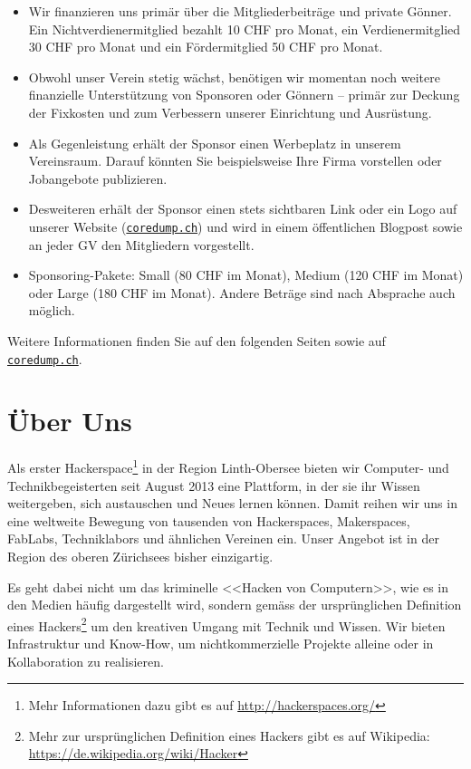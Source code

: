 \documentclass[10pt,a4paper,parskip,fleqn]{scrartcl}
\begin{document}
\begin{itemize}
	\item Wir finanzieren uns primär über die Mitgliederbeiträge und private
		Gönner. Ein Nichtverdienermitglied bezahlt 10 CHF pro Monat, ein
		Verdienermitglied 30 CHF pro Monat und ein Fördermitglied 50 CHF pro Monat.
	\item Obwohl unser Verein stetig wächst, benötigen wir momentan noch weitere
		finanzielle Unterstützung von Sponsoren oder Gönnern -- primär zur Deckung
		der Fixkosten und zum Verbessern unserer Einrichtung und Ausrüstung.
	\item Als Gegenleistung erhält der Sponsor einen Werbeplatz in unserem
		Vereinsraum. Darauf könnten Sie beispielsweise Ihre Firma vorstellen oder
		Jobangebote publizieren.
	\item Desweiteren erhält der Sponsor einen stets sichtbaren Link oder ein Logo
		auf unserer Website (\href{https://www.coredump.ch/}{\texttt{coredump.ch}})
		und wird in einem öffentlichen Blogpost sowie an jeder GV den Mitgliedern
		vorgestellt.
	\item Sponsoring-Pakete: Small (80 CHF im Monat), Medium (120 CHF im Monat)
		oder Large (180 CHF im Monat). Andere Beträge sind nach Absprache auch
		möglich.
\end{itemize}

Weitere Informationen finden Sie auf den folgenden Seiten sowie auf
\href{https://www.coredump.ch/}{\texttt{coredump.ch}}.

\newpage

\section{Über Uns}

Als erster Hackerspace\footnote{Mehr Informationen dazu gibt es auf
\url{http://hackerspaces.org/}} in der Region Linth-Obersee bieten wir Computer-
und Technikbegeisterten seit August 2013 eine Plattform, in der sie ihr Wissen
weitergeben, sich austauschen und Neues lernen können. Damit reihen wir uns in
eine weltweite Bewegung von tausenden von Hackerspaces, Makerspaces, FabLabs,
Techniklabors und ähnlichen Vereinen ein. Unser Angebot ist in der Region des
oberen Zürichsees bisher einzigartig.

Es geht dabei nicht um das kriminelle <<Hacken von Computern>>, wie es in den
Medien häufig dargestellt wird, sondern gemäss der ursprünglichen Definition
eines Hackers\footnote{Mehr zur ursprünglichen Definition eines Hackers gibt es
auf Wikipedia: \url{https://de.wikipedia.org/wiki/Hacker}} um den kreativen
Umgang mit Technik und Wissen. Wir bieten Infrastruktur und Know-How, um
nichtkommerzielle Projekte alleine oder in Kollaboration zu realisieren.
\end{document}
